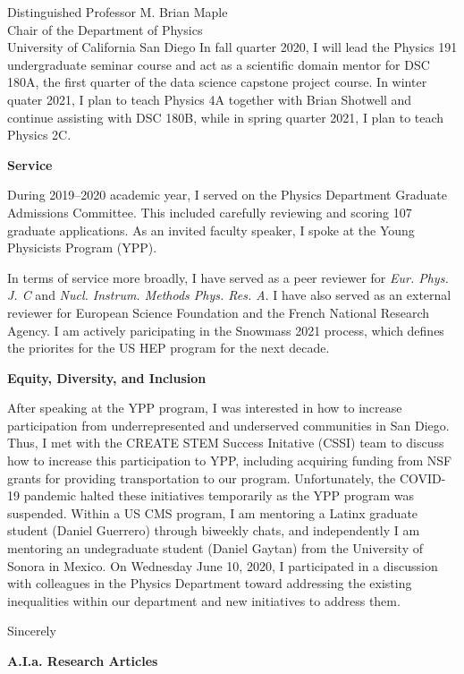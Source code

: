 \documentclass[ucsd,cs,11pt]{ucletter}
\begin{document}
\begin{letter}{
  Distinguished Professor M. Brian Maple\\
  Chair of the Department of Physics\\
  University of California San Diego
}
In fall quarter 2020, I will lead the Physics 191 undergraduate seminar course and act as a scientific domain mentor for DSC 180A, the first quarter of the data science capstone project course.
In winter quater 2021, I plan to teach Physics 4A together with Brian Shotwell and continue assisting with DSC 180B, while in spring quarter 2021, I plan to teach Physics 2C.

\textbf{Service}

During 2019--2020 academic year, I served on the Physics Department Graduate Admissions Committee.
This included carefully reviewing and scoring 107 graduate applications.
As an invited faculty speaker, I spoke at the Young Physicists Program (YPP).

In terms of service more broadly, I have served as a peer reviewer for \emph{Eur. Phys. J. C} and \emph{Nucl. Instrum. Methods Phys. Res. A}.
I have also served as an external reviewer for European Science Foundation and the French National Research Agency.
I am actively paricipating in the Snowmass 2021 process, which defines the priorites for the US HEP program for the next decade.

\textbf{Equity, Diversity, and Inclusion}

After speaking at the YPP program, I was interested in how to increase participation from underrepresented and underserved communities in San Diego.
Thus, I met with the CREATE STEM Success Initative (CSSI) team to discuss how to increase this participation to YPP, including acquiring funding from NSF grants for providing transportation to our program.
Unfortunately, the COVID-19 pandemic halted these initiatives temporarily as the YPP program was suspended.
Within a US CMS program, I am mentoring a Latinx graduate student (Daniel Guerrero) through biweekly chats, and independently I am mentoring an undegraduate student (Daniel Gaytan) from the University of Sonora in Mexico.
On Wednesday June 10, 2020, I participated in a discussion with colleagues in the Physics Department toward addressing the existing inequalities within our department and new initiatives to address them.

\closing{Sincerely}
\end{letter}


\nocite{*}
\printbibliography[heading=none]
\clearpage

\setcounter{page}{4}

\Large
\textbf{A.I.a. Research Articles}
\vspace{10pt}
\printbibliography[heading=none,keyword=career]
\end{document}
